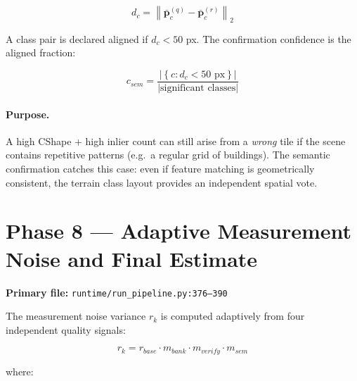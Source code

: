 \documentclass[12pt,a4paper]{article}
\newcommand{\norm}[1]{\left\lVert#1\right\rVert}
\begin{document}
\begin{equation}
    d_c = \norm{\bar{\mathbf{p}}^{(q)}_c - \bar{\mathbf{p}}^{(r)}_c}_2
    \label{eq:centroid_dist}
\end{equation}

A class pair is declared aligned if $d_c < 50$ px. The confirmation confidence
is the aligned fraction:

\begin{equation}
    c_{sem} =
    \frac{\left|\left\{c : d_c < 50 \text{ px}\right\}\right|}
    {|\text{significant classes}|}
    \label{eq:sem_conf}
\end{equation}

\paragraph{Purpose.}
A high CShape + high inlier count can still arise from a \emph{wrong} tile if
the scene contains repetitive patterns (e.g.\ a regular grid of buildings).
The semantic confirmation catches this case: even if feature matching is
geometrically consistent, the terrain class layout provides an independent
spatial vote.

\section{Phase 8 --- Adaptive Measurement Noise and Final Estimate}
\label{sec:adaptive_R}

\noindent\textbf{Primary file:} \texttt{runtime/run\_pipeline.py:376--390}

The measurement noise variance $r_k$ is computed adaptively from four
independent quality signals:

\begin{equation}
    r_k = r_{base} \cdot m_{bank} \cdot m_{verify} \cdot m_{sem}
    \label{eq:adaptive_R}
\end{equation}

where:
\end{document}
